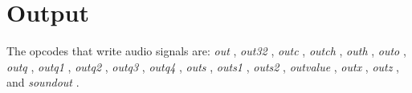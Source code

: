 \begin{comment}
\documentclass[10pt]{article}
\usepackage{fullpage, graphicx, url}
\setlength{\parskip}{1ex}
\setlength{\parindent}{0ex}
\title{Output}



\begin{tabular}{ccc}
The Alternative Csound Reference Manual & & \\
Previous &Signal Input and Output &Next

\end{tabular}

\end{comment}
\section{Output}


  The opcodes that write audio signals are: \emph{out}
, \emph{out32}
, \emph{outc}
, \emph{outch}
, \emph{outh}
, \emph{outo}
, \emph{outq}
, \emph{outq1}
, \emph{outq2}
, \emph{outq3}
, \emph{outq4}
, \emph{outs}
, \emph{outs1}
, \emph{outs2}
, \emph{outvalue}
, \emph{outx}
, \emph{outz}
, and \emph{soundout}
. 


\begin{comment}
\begin{tabular}{lcr}
Previous &Home &Next \\
Input &Up &Printing and Display

\end{tabular}



\end{comment}
